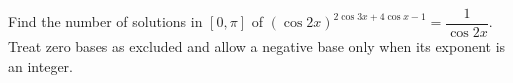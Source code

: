Find the number of solutions in $[0,\pi]$ of $(\cos2x)^{2\cos3x+4\cos x-1} = \dfrac{1}{\cos 2 x}$. Treat zero bases as excluded and allow a negative base only when its exponent is an integer.
